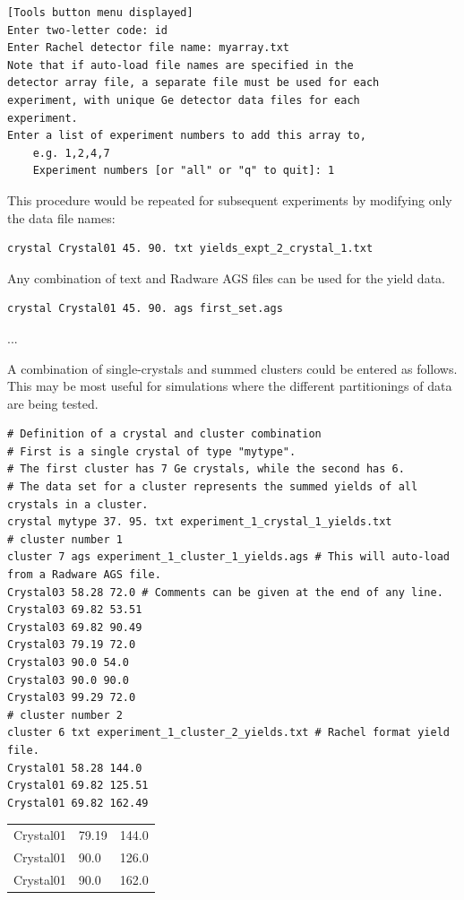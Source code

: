 \documentclass[10pt]{article}
\begin{document}
\begin{verbatim}
[Tools button menu displayed]
Enter two-letter code: id
Enter Rachel detector file name: myarray.txt
Note that if auto-load file names are specified in the
detector array file, a separate file must be used for each
experiment, with unique Ge detector data files for each
experiment.
Enter a list of experiment numbers to add this array to,
    e.g. 1,2,4,7
    Experiment numbers [or "all" or "q" to quit]: 1
\end{verbatim}

This procedure would be repeated for subsequent experiments by modifying only the data file names:

\begin{verbatim}
crystal Crystal01 45. 90. txt yields_expt_2_crystal_1.txt
\end{verbatim}

Any combination of text and Radware AGS files can be used for the yield data.

\begin{verbatim}
crystal Crystal01 45. 90. ags first_set.ags
\end{verbatim}

...

A combination of single-crystals and summed clusters could be entered as follows. This may be most useful for simulations where the different partitionings of data are being tested.

\begin{verbatim}
# Definition of a crystal and cluster combination
# First is a single crystal of type "mytype".
# The first cluster has 7 Ge crystals, while the second has 6.
# The data set for a cluster represents the summed yields of all crystals in a cluster.
crystal mytype 37. 95. txt experiment_1_crystal_1_yields.txt
# cluster number 1
cluster 7 ags experiment_1_cluster_1_yields.ags # This will auto-load from a Radware AGS file.
Crystal03 58.28 72.0 # Comments can be given at the end of any line.
Crystal03 69.82 53.51
Crystal03 69.82 90.49
Crystal03 79.19 72.0
Crystal03 90.0 54.0
Crystal03 90.0 90.0
Crystal03 99.29 72.0
# cluster number 2
cluster 6 txt experiment_1_cluster_2_yields.txt # Rachel format yield file.
Crystal01 58.28 144.0
Crystal01 69.82 125.51
Crystal01 69.82 162.49
\end{verbatim}

\begin{center}
\begin{tabular}{lll}
Crystal01 & 79.19 & 144.0 \\
Crystal01 & 90.0 & 126.0 \\
Crystal01 & 90.0 & 162.0 \\
\end{tabular}
\end{center}
\end{document}
